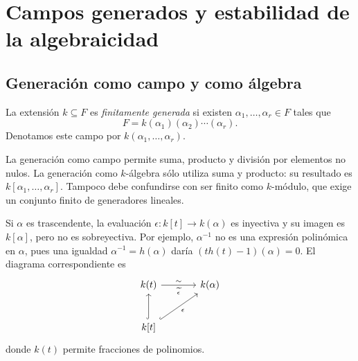 \section{Campos generados y estabilidad de la algebraicidad}
\subsection{Generación como campo y como álgebra}
\begin{defi}
La extensión $k\subseteq F$ es \emph{finitamente generada} si existen $\alpha_1,\ldots,\alpha_r\in F$ tales que
\[
F=k(\alpha_1)(\alpha_2)\cdots(\alpha_r).
\]
Denotamos este campo por $k(\alpha_1,\ldots,\alpha_r)$.
\end{defi}
La generación como campo permite suma, producto y división por elementos no nulos. La generación como $k$-álgebra sólo utiliza suma y producto: su resultado es $k[\alpha_1,\ldots,\alpha_r]$. Tampoco debe confundirse con ser finito como $k$-módulo, que exige un conjunto finito de generadores lineales.

Si $\alpha$ es trascendente, la evaluación $\epsilon:k[t]\to k(\alpha)$ es inyectiva y su imagen es $k[\alpha]$, pero no es sobreyectiva. Por ejemplo, $\alpha^{-1}$ no es una expresión polinómica en $\alpha$, pues una igualdad $\alpha^{-1}=h(\alpha)$ daría $(th(t)-1)(\alpha)=0$. El diagrama correspondiente es
\[
\begin{tikzcd}[column sep=large,row sep=large]
k(t)\arrow[r,"\sim","\widetilde\epsilon"']&k(\alpha)\\
k[t]\arrow[u,hook]\arrow[ur,hook,"\epsilon"']&
\end{tikzcd}
\]
donde $k(t)$ permite fracciones de polinomios.


